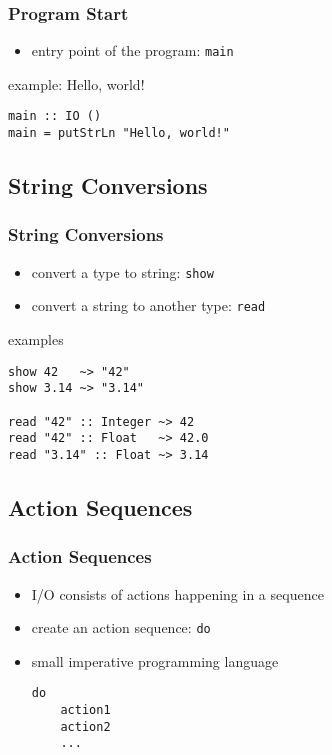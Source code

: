 \documentclass[dvipsnames]{beamer}
\theoremstyle{plain}
\begin{document}
\begin{frame}[fragile]
  \frametitle{Program Start}

  \begin{itemize}
    \item entry point of the program: \lstinline|main|
  \end{itemize}

  \medskip
  \begin{exampleblock}{example: Hello, world!}
    \begin{lstlisting}
main :: IO ()
main = putStrLn "Hello, world!"
    \end{lstlisting}
  \end{exampleblock}
\end{frame}

\subsection{String Conversions}

\begin{frame}[fragile]
  \frametitle{String Conversions}

  \begin{itemize}
    \item convert a type to string: \lstinline|show|
    \item convert a string to another type: \lstinline|read|
  \end{itemize}

  \begin{exampleblock}{examples}
    \begin{lstlisting}
show 42   ~> "42"
show 3.14 ~> "3.14"

read "42" :: Integer ~> 42
read "42" :: Float   ~> 42.0
read "3.14" :: Float ~> 3.14
    \end{lstlisting}
  \end{exampleblock}
\end{frame}

\subsection{Action Sequences}

\begin{frame}[fragile]
  \frametitle{Action Sequences}

  \begin{itemize}
    \item I/O consists of \alert{actions} happening in a sequence
    \item create an action sequence: \lstinline|do|
    \item small imperative programming language

    \medskip
    \begin{lstlisting}
do
    action1
    action2
    ...
    \end{lstlisting}
  \end{itemize}
\end{frame}
\end{document}
